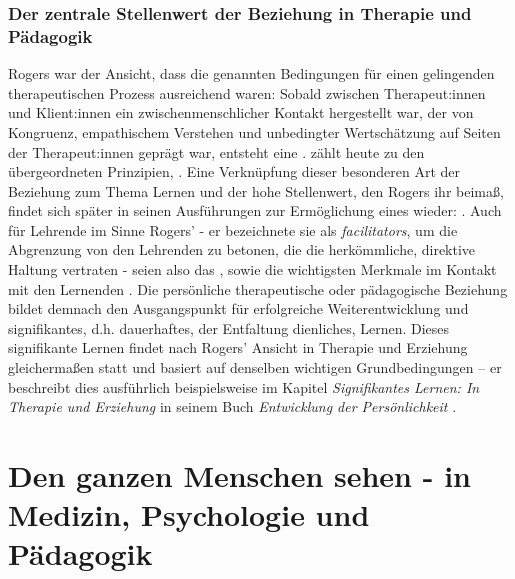 \documentclass[
  twoside,
  parskip=half-,
  paper=176mm:246mm,
  BCOR=14mm,
  DIV=14,
]{scrreprt}
\begin{document}
\subsection{Der zentrale Stellenwert der Beziehung in Therapie und Pädagogik}
Rogers war der Ansicht, dass die genannten Bedingungen für einen gelingenden therapeutischen Prozess ausreichend waren: Sobald zwischen Therapeut:innen und Klient:innen ein zwischenmenschlicher Kontakt hergestellt war, der von Kongruenz, empathischem Verstehen und unbedingter Wertschätzung auf Seiten der Therapeut:innen geprägt war, entsteht eine .  zählt heute zu den übergeordneten Prinzipien, . Eine Verknüpfung dieser besonderen Art der Beziehung zum Thema Lernen und der hohe Stellenwert, den Rogers ihr beimaß, findet sich später in seinen Ausführungen zur Ermöglichung eines  wieder: . Auch für Lehrende im Sinne Rogers' - er bezeichnete sie als \textit{facilitators}, um die Abgrenzung von den Lehrenden zu betonen, die die herkömmliche, direktive Haltung vertraten -  seien also das ,  sowie  die wichtigsten Merkmale im Kontakt mit den Lernenden \autocite[107-114]{rogersLernenFreiheit}. Die persönliche therapeutische oder pädagogische Beziehung bildet demnach den Ausgangspunkt für erfolgreiche Weiterentwicklung und signifikantes, d.h. dauerhaftes, der Entfaltung dienliches, Lernen. Dieses signifikante Lernen findet nach Rogers' Ansicht in Therapie und Erziehung gleichermaßen statt und basiert auf denselben wichtigen Grundbedingungen -- er beschreibt dies ausführlich beispielsweise im Kapitel \textit{Signifikantes  Lernen: In Therapie und Erziehung} in seinem Buch \textit{Entwicklung der Persönlichkeit} \autocite[273-289]{rogers1961}. 

\chapter{Den ganzen Menschen sehen - in Medizin, Psychologie und Pädagogik}
\end{document}
